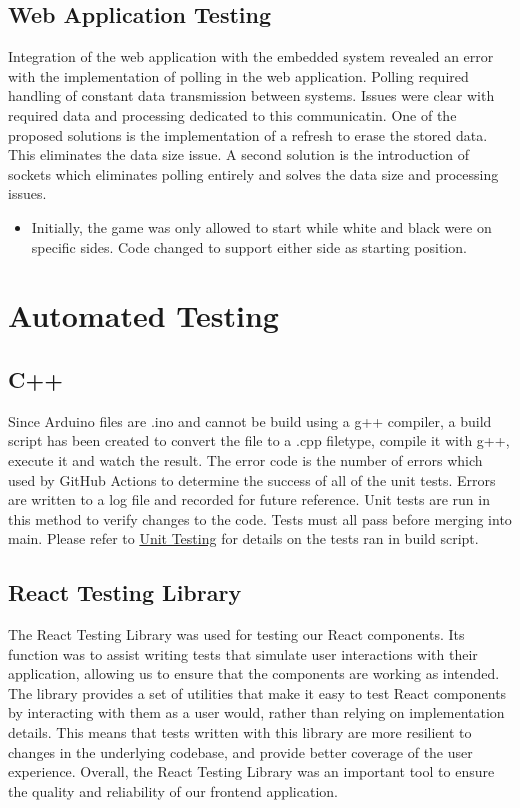 \documentclass[12pt, titlepage]{article}
\begin{document}
\subsection{Web Application Testing}
Integration of the web application with the embedded system revealed an error 
with the implementation of polling in the web application. Polling required 
handling of constant data transmission between systems. Issues were clear with 
required data and processing dedicated to this communicatin. One of the proposed
solutions is the implementation of a refresh to erase the stored data. This 
eliminates the data size issue. A second solution is the introduction of sockets
which eliminates polling entirely and solves the data size and processing issues. 


\begin{itemize}
  \item Initially, the game was only allowed to start while white and black were on specific sides. Code changed to support either side as starting position.
\end{itemize}
  

\section{Automated Testing}
\subsection{C++}
  Since Arduino files are .ino and cannot be build using a g++ compiler, a build script has been created to convert the file to a .cpp filetype, compile it with
  g++, execute it and watch the result. The error code is the number of errors which used by GitHub Actions to determine the success of all of the unit tests. Errors
  are written to a log file and recorded for future reference. Unit tests are run in this method to verify changes to the code. Tests must all pass before merging
  into main. Please refer to \hyperref[UnitTest]{Unit Testing} for details on the tests ran in build script.

\subsection{React Testing Library}
The React Testing Library was used for testing our React components. 
Its function was to assist writing tests that simulate user 
interactions with their application, allowing us to ensure that the components 
are working as intended. The library provides a set of utilities that make it 
easy to test React components by interacting with them as a user would, rather 
than relying on implementation details. This means that tests written with this library
are more resilient to changes in the underlying codebase, and 
provide better coverage of the user experience. Overall, the React Testing Library
was an important tool to ensure the quality and reliability
of our frontend application.
		
\end{document}
